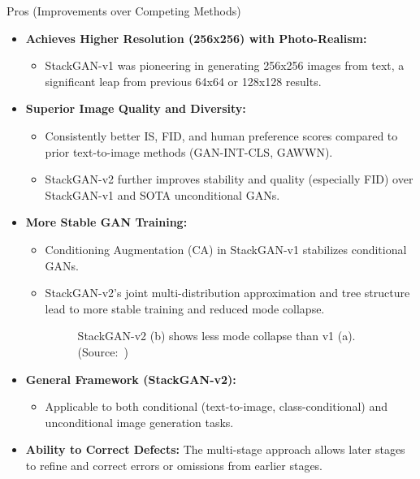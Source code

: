 \documentclass{beamer}
\newcommand{\paperfigure}[3][width=\textwidth]{%
    \begin{figure}%
        \centering%
        \caption{#3 (Source:~\cite{stackgan++})}%
        \label{fig:#2}%
    \end{figure}%
}
\begin{document}
\begin{frame}{Pros (Improvements over Competing Methods)}
    \begin{itemize}
        \item \textbf{Achieves Higher Resolution (256x256) with Photo-Realism:}
            \begin{itemize}
                \item StackGAN-v1 was pioneering in generating 256x256 images from text, a significant leap from previous 64x64 or 128x128 results.
            \end{itemize}
        \item \textbf{Superior Image Quality and Diversity:}
            \begin{itemize}
                \item Consistently better IS, FID, and human preference scores compared to prior text-to-image methods (GAN-INT-CLS, GAWWN).
                \item StackGAN-v2 further improves stability and quality (especially FID) over StackGAN-v1 and SOTA unconditional GANs.
            \end{itemize}
        \item \textbf{More Stable GAN Training:}
            \begin{itemize}
                \item Conditioning Augmentation (CA) in StackGAN-v1 stabilizes conditional GANs.
                \item StackGAN-v2's joint multi-distribution approximation and tree structure lead to more stable training and reduced mode collapse.
                \paperfigure[height=0.25\textheight]{fig5_tsne_mode_collapse}{StackGAN-v2 (b) shows less mode collapse than v1 (a).}
            \end{itemize}
        \item \textbf{General Framework (StackGAN-v2):}
            \begin{itemize}
                \item Applicable to both conditional (text-to-image, class-conditional) and unconditional image generation tasks.
            \end{itemize}
        \item \textbf{Ability to Correct Defects:} The multi-stage approach allows later stages to refine and correct errors or omissions from earlier stages.
    \end{itemize}
\end{frame}
\end{document}
